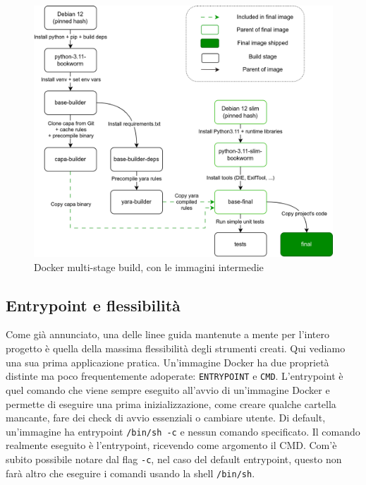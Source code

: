 \begin{figure}[htbp]
    \centering
    \includegraphics[width=\textwidth]{assets/dockerfile.png}
    \caption{Docker multi-stage build, con le immagini intermedie}
    \label{fig:static_dockerfile_multistage_build}
\end{figure}

\subsection{Entrypoint e flessibilità}
Come già annunciato, una delle linee guida mantenute a mente per l'intero progetto è quella della massima flessibilità degli strumenti creati. Qui vediamo una sua prima applicazione pratica.
Un'immagine Docker ha due proprietà distinte ma poco frequentemente adoperate: \texttt{ENTRYPOINT} e \texttt{CMD}.
L'entrypoint è quel comando che viene sempre eseguito all'avvio di un'immagine Docker e permette di eseguire una prima inizializzazione, come creare qualche cartella mancante, fare dei check di avvio essenziali o cambiare utente. Di default, un'immagine ha entrypoint \texttt{/bin/sh -c} e nessun comando specificato.
Il comando realmente eseguito è l'entrypoint, ricevendo come argomento il CMD. Com'è subito possibile notare dal flag \texttt{-c}, nel caso del default entrypoint, questo non farà altro che eseguire i comandi usando la shell \texttt{/bin/sh}.

